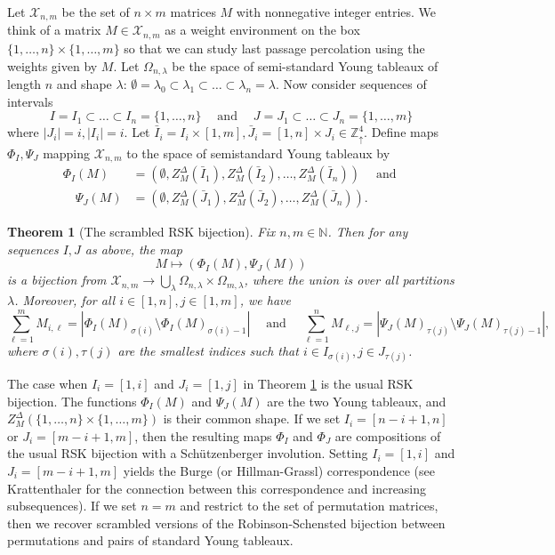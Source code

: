 \documentclass[aop, preprint]{imsart}
\theoremstyle{plain}
\newtheorem{theorem}{Theorem}[section]
\theoremstyle{definition}
\theoremstyle{plain}
\newcommand{\N}{\mathbb{N}}
\newcommand{\sset}{\subset}
\newcommand{\la}{\lambda}
\newcommand{\Om}{\Omega}
\newcommand{\mathand}{\;\text{and}\;}
\newcommand{\sig}{\sigma}
\newcommand{\Zd}{\mathds{Z}^4_\uparrow}
\newcommand{\scrX}{\mathcal{X}}
\newcommand{\X}{\times}
\newcommand{\smin}{\setminus}
\begin{document}
Let $\scrX_{n, m}$ be the set of $n \X m$ matrices $M$ with nonnegative integer entries. We think of a matrix $M \in \scrX_{n, m}$ as a weight environment  on the box $\{1, \dots, n\} \X \{1, \dots, m\}$ so that we can study last passage percolation using the weights given by $M$. Let $\Om_{n, \la}$ be the space of semi-standard Young tableaux of length $n$ and shape $\la$: $\emptyset = \la_0 \sset \la_1 \sset \dots \sset \la_n = \la$. Now consider sequences of intervals 
$$
I = I_1 \sset \dots \sset I_n = \{1, \dots, n\} \quad \mathand \quad J = J_1 \sset \dots \sset J_n = \{1, \dots, m\}
$$
where $|J_i| = i, |I_i| = i$. Let $\bar I_i = I_i \X [1, m], \bar J_i = [1, n] \X J_i \in \Zd$. 
Define maps $\Phi_I, \Psi_J$ mapping $\scrX_{n, m}$ to the space of semistandard Young tableaux by
\begin{align*}
\Phi_I(M) &= (\emptyset, Z^\Delta_M(\bar I_1), Z^\Delta_M(\bar I_2), \dots, Z^\Delta_M(\bar I_n)) \quad \mathand \\
\quad \Psi_J(M) &= (\emptyset, Z^\Delta_M(\bar J_1), Z^\Delta_M(\bar J_2), \dots, Z^\Delta_M(\bar J_n)).
\end{align*}

\begin{theorem}[The scrambled RSK bijection]
	\label{T:rsk-scramble}
	Fix $n, m \in \N$. Then for any sequences $I, J$ as above, the map 
	$$
	M \mapsto (\Phi_I(M), \Psi_J(M))
	$$
	is a bijection from $\scrX_{n, m} \to \bigcup_\la \Om_{n, \la} \X \Om_{m, \la}$, where the union is over all partitions $\la$. Moreover, for all $i \in [1, n], j \in [1, m]$, we have
	$$
	\sum_{\ell=1}^m M_{i, \ell} = |\Phi_I(M)_{\sig(i)} \smin \Phi_I(M)_{\sig(i) - 1} |  \quad \mathand \quad \sum_{\ell=1}^n M_{\ell, j} = |\Psi_J(M)_{\tau(j)} \smin \Psi_J(M)_{\tau(j) - 1}|,
	$$
	where $\sig(i), \tau(j)$ are the smallest indices such that $i \in I_{\sig(i)}, j \in J_{\tau(j)}$. 
\end{theorem}

The case when $I_i = [1, i]$ and $J_i = [1, j]$ in Theorem \ref{T:rsk-scramble} is the usual RSK bijection. The functions $\Phi_I(M)$ and $\Psi_J(M)$ are the two Young tableaux, and $Z_M^\Delta(\{1, \dots, n\} \X \{1, \dots, m\})$ is their common shape.
If we set $I_i = [n- i + 1, n]$ or $J_i = [m-i + 1, m]$, then the resulting maps $\Phi_I$ and $\Phi_J$ are compositions of the usual RSK bijection with a Sch\"utzenberger involution. Setting $I_i = [1, i]$ and $J_i = [m-i + 1, m]$ yields the Burge (or Hillman-Grassl) correspondence \cite{burge1974four} (see Krattenthaler \cite{krattenthaler2005growth} for the connection between this correspondence and increasing subsequences).
If we set $n = m$ and restrict to the set of permutation matrices, then we recover scrambled versions of the Robinson-Schensted bijection between permutations and pairs of standard Young tableaux. 
\end{document}
